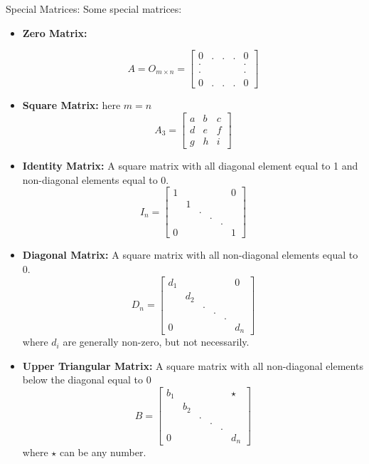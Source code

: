 \documentclass{article}
\begin{document}
\begin{paragraph}{Special Matrices:} Some special matrices:
\begin{itemize}

    \item \textbf{Zero Matrix:} 
    
    $$ A = O_{m \times n} = \begin{bmatrix}
        0 & . & . & . & 0 \\
        \cdot &&&& \cdot \\
        \cdot &&&& \cdot \\
        0 & . & . & . & 0
    \end{bmatrix}$$
    
    \item \textbf{Square Matrix:} here $m = n$
        $$A_3 = \begin{bmatrix}
            a & b & c \\
            d & e & f \\
            g & h & i
        \end{bmatrix}$$

    \item \textbf{Identity Matrix:} A square matrix with all diagonal element equal to 1 and non-diagonal elements equal to 0.
        $$ I_n = \begin{bmatrix}
            1 &&&&& 0 \\
            &1&&&&\\
            &&.&&&\\
            &&&.&&\\
            &&&&.&\\
            0&&&&&1
        \end{bmatrix}$$

    \item \textbf{Diagonal Matrix:} A square matrix with all non-diagonal elements equal to 0.
        $$ D_n = \begin{bmatrix}
            d_1 &&&&& 0 \\
            &d_2&&&&\\
            &&.&&&\\
            &&&.&&\\
            &&&&.&\\
            0&&&&&d_n
        \end{bmatrix}$$
        where $d_i$ are generally non-zero, but not necessarily.
        
    \item \textbf{Upper Triangular Matrix:} A square matrix with all non-diagonal elements below the diagonal equal to 0
        $$ B = \begin{bmatrix}
            b_1 &&&&& \star \\
            &b_2&&&&\\
            &&.&&&\\
            &&&.&&\\
            &&&&.&\\
            0&&&&&d_n
        \end{bmatrix}$$
        where $\star$ can be any number.


\end{itemize}
\end{paragraph}
\end{document}
